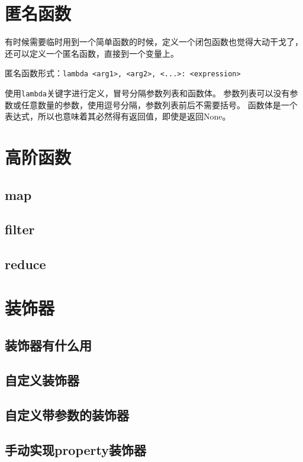 \documentclass{ctexbook}
\begin{document}
\section{匿名函数}

有时候需要临时用到一个简单函数的时候，定义一个闭包函数也觉得大动干戈了，还可以定义一个匿名函数，直接到一个变量上。

匿名函数形式：\verb|lambda <arg1>, <arg2>, <...>: <expression>|

使用\verb|lambda|关键字进行定义，冒号分隔参数列表和函数体。
参数列表可以没有参数或任意数量的参数，使用逗号分隔，参数列表前后不需要括号。
函数体是一个表达式，所以也意味着其必然得有返回值，即使是返回None。

\section{高阶函数}

	\subsection{map}
	\subsection{filter}
	\subsection{reduce}

\section{装饰器}

	\subsection{装饰器有什么用}
	\subsection{自定义装饰器}
	\subsection{自定义带参数的装饰器}
	\subsection{手动实现property装饰器}
\end{document}
